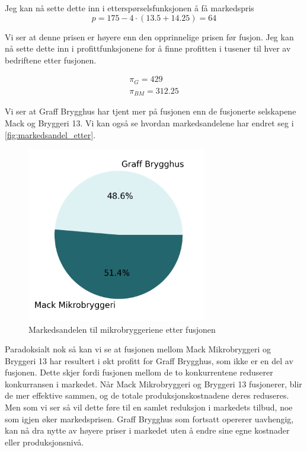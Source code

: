\documentclass[
  12pt,
  a4paper,
  DIV=11,
  numbers=noendperiod]{scrartcl}
\begin{document}
Jeg kan nå sette dette inn i etterspørselsfunksjonen å få markedspris \[
p = 175 - 4 \cdot (13.5 + 14.25) = 64
\]

Vi ser at denne prisen er høyere enn den opprinnelige prisen før fusjon.
Jeg kan nå sette dette inn i profittfunksjonene for å finne profitten i
tusener til hver av bedriftene etter fusjonen.

\begin{align*}
\pi_G = 429 \\
\pi_{BM} = 312.25
\end{align*}

Vi ser at Graff Brygghus har tjent mer på fusjonen enn de fusjonerte
selskapene Mack og Bryggeri 13. Vi kan også se hvordan markedsandelene
har endret seg i \autoref{fig:markedsandel_etter}.

\newpage

\begin{figure}[t]
\centering
\includegraphics[width=0.7\textwidth]{dokumentobjekter/figurer/markedsandel_mikrobryggerier_fusjon.png}
\caption{Markedsandelen til mikrobryggeriene etter fusjonen}
\label{fig:markedsandel_etter}
\end{figure}

Paradoksialt nok så kan vi se at fusjonen mellom Mack Mikrobryggeri og
Bryggeri 13 har resultert i økt profitt for Graff Brygghus, som ikke er
en del av fusjonen. Dette skjer fordi fusjonen mellom de to
konkurrentene reduserer konkurransen i markedet. Når Mack Mikrobryggeri
og Bryggeri 13 fusjonerer, blir de mer effektive sammen, og de totale
produksjonskostnadene deres reduseres. Men som vi ser så vil dette føre
til en samlet reduksjon i markedets tilbud, noe som igjen øker
markedsprisen. Graff Brygghus som fortsatt opererer uavhengig, kan nå
dra nytte av høyere priser i markedet uten å endre sine egne kostnader
eller produksjonsnivå.
\end{document}
